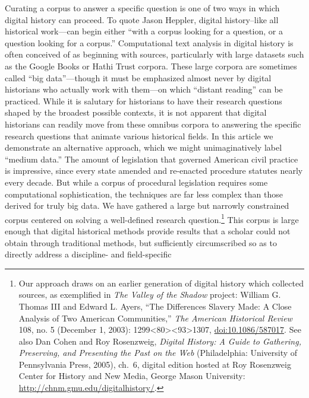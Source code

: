 \documentclass[12pt,]{article}
\let\rmarkdownfootnote\footnote%
\def\footnote{\protect\rmarkdownfootnote}
\begin{document}
Curating a corpus to answer a specific question is one of two ways in
which digital history can proceed. To quote Jason Heppler, digital
history--like all historical work---can begin either ``with a corpus
looking for a question, or a question looking for a corpus.''
Computational text analysis in digital history is often conceived of as
beginning with sources, particularly with large datasets such as the
Google Books or Hathi Trust corpora. These large corpora are sometimes
called ``big data''---though it must be emphasized almost never by
digital historians who actually work with them---on which ``distant
reading'' can be practiced. While it is salutary for historians to have
their research questions shaped by the broadest possible contexts, it is
not apparent that digital historians can readily move from these omnibus
corpora to answering the specific research questions that animate
various historical fields. In this article we demonstrate an alternative
approach, which we might unimaginatively label ``medium data.'' The
amount of legislation that governed American civil practice is
impressive, since every state amended and re-enacted procedure statutes
nearly every decade. But while a corpus of procedural legislation
requires some computational sophistication, the techniques are far less
complex than those derived for truly big data. We have gathered a large
but narrowly constrained corpus centered on solving a well-defined
research question.\footnote{Our approach draws on an earlier generation
  of digital history which collected sources, as exemplified in
  \emph{The Valley of the Shadow} project: William G. Thomas III and
  Edward L. Ayers, ``The Differences Slavery Made: A Close Analysis of
  Two American Communities,'' \emph{The American Historical Review} 108,
  no. 5 (December 1, 2003):
  1299\textless80\textgreater\textless93\textgreater1307,
  \url{doi:10.1086/587017}. See also Dan Cohen and Roy Rosenzweig,
  \emph{Digital History: A Guide to Gathering, Preserving, and
  Presenting the Past on the Web} (Philadelphia: University of
  Pennsylvania Press, 2005), ch.~6, digital edition hosted at Roy
  Rosenzweig Center for History and New Media, George Mason University:
  \url{http://chnm.gmu.edu/digitalhistory/}.} This corpus is large
enough that digital historical methods provide results that a scholar
could not obtain through traditional methods, but sufficiently
circumscribed so as to directly address a discipline- and field-specific
\end{document}
